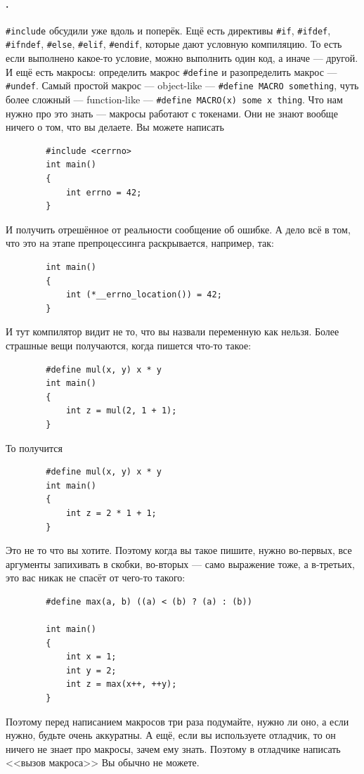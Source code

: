 \documentclass{article}
\begin{document}
    \paragraph{.}
    \texttt{#include} обсудили уже вдоль и поперёк. Ещё есть директивы \texttt{#if}, \texttt{#ifdef}, \texttt{#ifndef}, \texttt{#else}, \texttt{#elif}, \texttt{#endif}, которые дают условную компиляцию. То есть если выполнено какое-то условие, можно выполнить один код, а иначе --- другой. И ещё есть макросы: определить макрос \texttt{#define} и разопределить макрос --- \texttt{#undef}. Самый простой макрос --- object-like --- \texttt{#define MACRO something}, чуть более сложный --- function-like --- \texttt{#define MACRO(x) some x thing}. Что нам нужно про это знать --- макросы работают с токенами. Они не знают вообще ничего о том, что вы делаете. Вы можете написать
    \begin{verbatim}
        #include <cerrno>
        int main()
        {
            int errno = 42;
        }
    \end{verbatim}
    И получить отрешённое от реальности сообщение об ошибке. А дело всё в том, что это на этапе препроцессинга раскрывается, например, так:
    \begin{verbatim}
        int main()
        {
            int (*__errno_location()) = 42;
        }
    \end{verbatim}
    И тут компилятор видит не то, что вы назвали переменную как нельзя. Более страшные вещи получаются, когда пишется что-то такое:
    \begin{verbatim}
        #define mul(x, y) x * y
        int main()
        {
            int z = mul(2, 1 + 1);
        }
    \end{verbatim}
    То получится
    \begin{verbatim}
        #define mul(x, y) x * y
        int main()
        {
            int z = 2 * 1 + 1;
        }
    \end{verbatim}
    Это не то что вы хотите. Поэтому когда вы такое пишите, нужно во-первых, все аргументы запихивать в скобки, во-вторых --- само выражение тоже, а в-третьих, это вас никак не спасёт от чего-то такого:
    \begin{verbatim}
        #define max(a, b) ((a) < (b) ? (a) : (b))

        int main()
        {
            int x = 1;
            int y = 2;
            int z = max(x++, ++y);
        }
    \end{verbatim}
    Поэтому перед написанием макросов три раза подумайте, нужно ли оно, а если нужно, будьте очень аккуратны. А ещё, если вы используете отладчик, то он ничего не знает про макросы, зачем ему знать. Поэтому в отладчике написать <<вызов макроса>> Вы обычно не можете.
\end{document}
